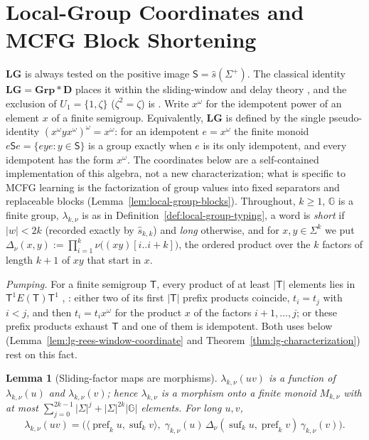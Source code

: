 \documentclass[11pt]{article}
\numberwithin{equation}{section}
\theoremstyle{plain}
\newtheorem{lemma}[theorem]{Lemma}
\theoremstyle{definition}
\theoremstyle{remark}
\theoremstyle{plain}
\begin{document}
\section{Local-Group Coordinates and MCFG Block Shortening}
\label{app:local-group}

$\mathbf{LG}$ is always tested on the positive image $\mathsf S=\widehat s(\Sigma^+)$.  The
classical identity $\mathbf{LG}=\mathbf{Grp}*\mathbf D$ places it within the
sliding-window and delay theory \cite{Straubing1985,Tilson1987}, and the exclusion of
$U_1=\{1,\zeta\}$ ($\zeta^2=\zeta$) is \cite[Proposition~2.3]{AlmeidaEtAl2009}.
Write $x^\omega$ for the idempotent power of an element $x$ of a finite semigroup.
Equivalently, $\mathbf{LG}$ is defined by the single pseudo-identity
$(x^\omega yx^\omega)^\omega=x^\omega$: for an idempotent $e=x^\omega$ the finite monoid
$e\mathsf Se=\{eye:y\in\mathsf S\}$ is a group exactly when $e$ is its only idempotent, and
every idempotent has the form $x^\omega$.
The coordinates below are a self-contained implementation of this algebra, not a
new characterization; what is specific to MCFG learning is the factorization of group
values into fixed separators and replaceable blocks
(Lemma~\ref{lem:local-group-blocks}).  Throughout, $k\ge1$, ${\mathbb G}$ is a finite group,
$\lambda_{k,\nu}$ is as in Definition~\ref{def:local-group-typing}, a word is
\emph{short} if $|w|<2k$ (recorded exactly by $\widehat s_{k,k}$) and \emph{long}
otherwise, and for $x,y\in\Sigma^k$ we put
$\Delta_\nu(x,y):=\prod_{i=1}^{k}\nu\bigl((xy)[i..i+k]\bigr)$, the ordered product over
the $k$ factors of length $k+1$ of $xy$ that start in $x$.

\emph{Pumping.}  For a finite semigroup $\mathsf T$, every product of at least
$|\mathsf T|$ elements lies in $\mathsf T^1E(\mathsf T)\mathsf T^1$
\cite[Lemma~2.2]{AlmeidaEtAl2009}, \cite{Pin1986}: either two of its first
$|\mathsf T|$ prefix products coincide, $t_i=t_j$ with $i<j$, and then
$t_i=t_ix^\omega$ for the product $x$ of the factors $i+1,\ldots,j$; or these prefix
products exhaust $\mathsf T$ and one of them is idempotent.  Both uses below
(Lemma~\ref{lem:lg-rees-window-coordinate} and
Theorem~\ref{thm:lg-characterization}) rest on this fact.

\begin{lemma}[Sliding-factor maps are morphisms]
\label{lem:local-group-morphism}
$\lambda_{k,\nu}(uv)$ is a function of $\lambda_{k,\nu}(u)$ and $\lambda_{k,\nu}(v)$;
hence $\lambda_{k,\nu}$ is a morphism onto a finite monoid $M_{k,\nu}$ with at most
$\sum_{j=0}^{2k-1}|\Sigma|^j+|\Sigma|^{2k}|{\mathbb G}|$ elements.  For long $u,v$,
\[
 \lambda_{k,\nu}(uv)
 =\bigl(\langle\operatorname{pref}_ku,\operatorname{suf}_kv\rangle,\;
   \gamma_{k,\nu}(u)\,\Delta_\nu(\operatorname{suf}_ku,\operatorname{pref}_kv)\,
   \gamma_{k,\nu}(v)\bigr).
\]
\end{lemma}
\end{document}
